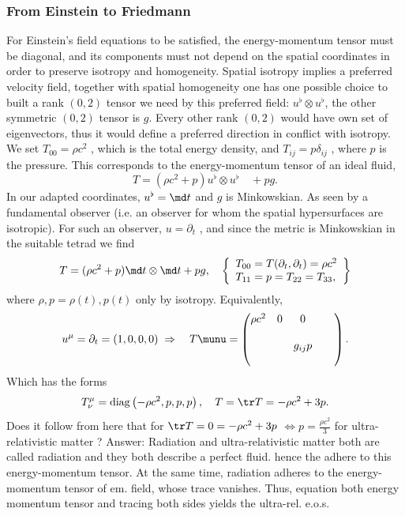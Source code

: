 	
	
	
	
	\subsubsection{From Einstein to Friedmann}
	For Einstein’s field equations to be satisfied, the energy-momentum
	tensor must be diagonal, and its components must not depend on the
	spatial coordinates in order to preserve isotropy and homogeneity. Spatial isotropy implies a preferred velocity field, together with spatial homogeneity one has one possible choice to built a rank $(0,2)$ tensor we need  by this preferred field: $u^{\flat} \otimes u^{\flat}$, the other symmetric $(0,2)$ tensor is $g$. Every other rank $(0,2)$ would have own set of eigenvectors, thus it would define a preferred direction in conflict with isotropy. We
	set $T_{00} = ρc^2$ , which is the total energy density, and $T_{ij} = p δ_{i j}$ , where $p$
	is the pressure.
	This corresponds to the energy-momentum tensor of an ideal fluid,
	\begin{equation}
		T = (\rho c^2 + p) u^{\flat} \otimes u^{\flat}\quad + p g.
	\end{equation}
	In our adapted coordinates, $u^{\flat} = \md t$ and $g$ is Minkowskian. As seen by a fundamental observer (i.e. an observer for whom the spatial
	hypersurfaces are isotropic). For such an observer, $u = \partial_t$ , and since the
	metric is Minkowskian in the suitable tetrad we find
	\begin{equation}
		T = (\rho c^2+p) \md t\otimes \md t+ pg, \quad \left\{	\begin{array}{lr}
		T_{00} = T(\partial_t,\partial_t) = \rho c^2 \\
		T_{11} = p = T_{22} = T_{33},
		\end{array}		\right\}
	\end{equation}
	where $\rho,p = \rho(t), p(t)$ only by isotropy. Equivalently, 
	\begin{equation}
		u^\mu= \partial_t=(1,0,0,0) \; \Rightarrow \quad T\munu=\begin{pmatrix}
		\rho c^2 &0&0&\\
		&&&&\\
		&&g_{ij} p&&\\
		&&&&
		\end{pmatrix}.
	\end{equation}
	Which has the forms
	\begin{equation}
		T^\mu_\nu = \mathrm{diag}\left(-\rho c^2,p,p,p\right),\quad T= \tr T = -\rho c^2+ 3p.
	\end{equation}
	Does it follow from here that for $\tr T=0=-\rho c^2+3p$ $\Leftrightarrow p=\frac{\rho c^2}{3}$ for ultra-relativistic matter ? Answer: Radiation and ultra-relativistic matter both are called radiation and they both describe a perfect fluid. hence the adhere to this energy-momentum tensor. At the same time, radiation adheres to the energy-momentum tensor of em. field, whose trace vanishes. Thus, equation both energy momentum tensor and tracing both sides yields the ultra-rel. e.o.s.
	
